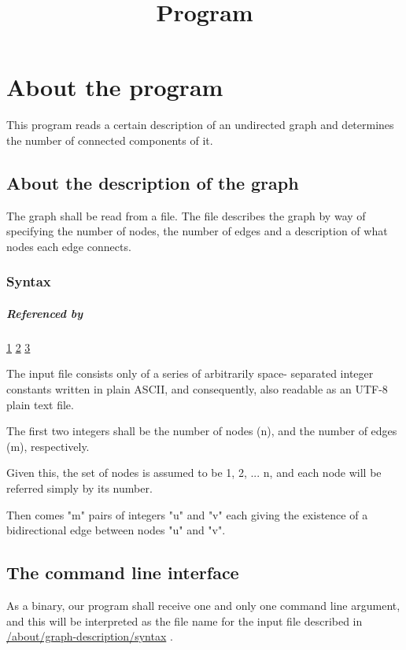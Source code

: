 \documentclass{book}
\title{Program}
\begin{document}
\maketitle {}
\tableofcontents{}

\chapter{About the program}
\hypertarget{/about}{}
This program reads a certain description of an undirected graph and 
determines the number of connected components of it. 
\section{About the description of the graph}
\hypertarget{/about/graph-description}{}
The graph shall be read from a file. The file describes 
the graph by way of specifying the number of nodes, the 
number of edges and a description of what nodes 
each edge connects. 
\subsection{Syntax}
\hypertarget{/about/graph-description/syntax}{}
\paragraph{Referenced by}
\hyperlink{link1}{1} \hyperlink{link2}{2} \hyperlink{link3}{3} 

The input file consists only of a series of arbitrarily space- 
separated integer constants written in plain ASCII, and 
consequently, also readable as an UTF-8 plain text file. 

The first two integers shall be the number of nodes (n), and the 
number of edges (m), respectively. 

Given this, the set of nodes is assumed to be {1, 2, ... n}, and 
each node will be referred simply by its number. 

Then comes "m" pairs of integers "u" and "v" each giving the 
existence of a bidirectional edge between nodes "u" and "v". 
\section{The command line interface}
\hypertarget{/about/interface}{}
As a binary, our program shall receive one and only one command line argument, and this will 
be interpreted as the file name for the input file described in \hypertarget{link1}{\hyperlink{/about/graph-description/syntax}{/about/graph-description/syntax}} . 
\end{document}
